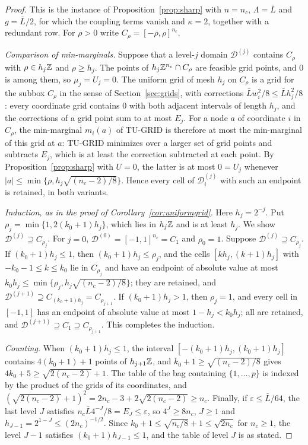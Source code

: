 \begin{proof}
This is the instance of Proposition~\ref{prop:sharp} with $n=n_c$,
$\Lambda=\bar L$ and $g=\bar L/2$, for which the coupling terms vanish and
$\kappa=2$, together with a redundant row. For $\rho>0$ write
$C_\rho=[-\rho,\rho]^{n_c}$.

\emph{Comparison of min-marginals.} Suppose that a level-$j$ domain
$\mathcal D^{(j)}$ contains $C_\rho$ with $\rho\in h_j\mathbb Z$ and $\rho\ge h_j$. The
points of $h_j\mathbb Z^{n_c}\cap C_\rho$ are feasible grid points, and $0$ is among
them, so $\mu_j=U_j=0$. The uniform grid of mesh $h_j$ on $C_\rho$ is a
grid for the subbox $C_\rho$ in the sense of Section~\ref{sec:grids}, with
corrections $\bar Lw_i^2/8\le\bar Lh_j^2/8$: every coordinate grid contains
$0$ with both adjacent intervals of length $h_j$, and the corrections of a
grid point sum to at most $E_j$. For a node $a$ of coordinate $i$ in
$C_\rho$, the min-marginal $m_i(a)$ of TU-GRID is therefore at most the
min-marginal of this grid at $a$: TU-GRID minimizes over a larger set of
grid points and subtracts $E_j$, which is at least the correction subtracted
at each point.
By Proposition~\ref{prop:sharp} with $U=0$, the latter is at most $0=U_j$
whenever $\lvert a\rvert\le\min\{\rho,h_j\sqrt{(n_c-2)/8}\}$. Hence every cell
of $\mathcal D^{(j)}_i$ with such an endpoint is retained, in both variants.

\emph{Induction, as in the proof of Corollary~\ref{cor:uniformgrid}.} Here
$h_j=2^{-j}$. Put $\rho_j=\min\{1,2(k_0+1)h_j\}$, which lies in $h_j\mathbb Z$ and is at
least $h_j$. We show $\mathcal D^{(j)}\supseteq C_{\rho_j}$. For $j=0$,
$\mathcal D^{(0)}=[-1,1]^{n_c}=C_1$ and $\rho_0=1$. Suppose
$\mathcal D^{(j)}\supseteq C_{\rho_j}$. If $(k_0+1)h_j\le1$, then
$(k_0+1)h_j\le\rho_j$, and the cells $[kh_j,(k+1)h_j]$ with $-k_0-1\le k\le k_0$ lie in
$C_{\rho_j}$ and have an endpoint of absolute value at most
$k_0 h_j\le\min\{\rho_j,h_j\sqrt{(n_c-2)/8}\}$; they are retained, and
$\mathcal D^{(j+1)}\supseteq C_{(k_0+1)h_j}=C_{\rho_{j+1}}$. If $(k_0+1)h_j>1$, then
$\rho_j=1$, and every cell in $[-1,1]$ has an endpoint of absolute value at
most $1-h_j<k_0 h_j$; all are retained, and
$\mathcal D^{(j+1)}\supseteq C_1\supseteq C_{\rho_{j+1}}$. This completes the
induction.

\emph{Counting.} When $(k_0+1)h_j\le1$, the interval $[-(k_0+1)h_j,(k_0+1)h_j]$
contains $4(k_0+1)+1$ points of $h_{j+1}\mathbb Z$, and $k_0+1\ge\sqrt{(n_c-2)/8}$ gives
$4k_0+5\ge\sqrt{2(n_c-2)}+1$. The table of the bag containing $\{1,\dots,p\}$ is
indexed by the product of the grids of its coordinates, and
$(\sqrt{2(n_c-2)}+1)^2=2n_c-3+2\sqrt{2(n_c-2)}\ge n_c$. Finally, if
$\varepsilon\le\bar L/64$, the last level $J$ satisfies
$n_c\bar L4^{-J}/8=E_J\le\varepsilon$, so $4^J\ge8n_c$, $J\ge1$ and
$h_{J-1}=2^{1-J}\le(2n_c)^{-1/2}$. Since
$k_0+1\le\sqrt{n_c/8}+1\le\sqrt{2n_c}$ for $n_c\ge1$, the level $J-1$ satisfies
$(k_0+1)h_{J-1}\le1$, and the table of level $J$ is as stated.
\end{proof}

